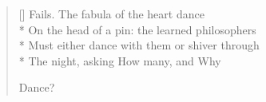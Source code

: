 \label{ch:lear_bi}
\settowidth{\versewidth}{On the head of a pin: the learned philosophers}
\begin{verse}[\versewidth]
Fails. The fabula of the heart dance\\*
On the head of a pin: the learned philosophers\\*
Must either dance with them or shiver through\\*
The night, asking How many, and Why

Dance?
\end{verse}
